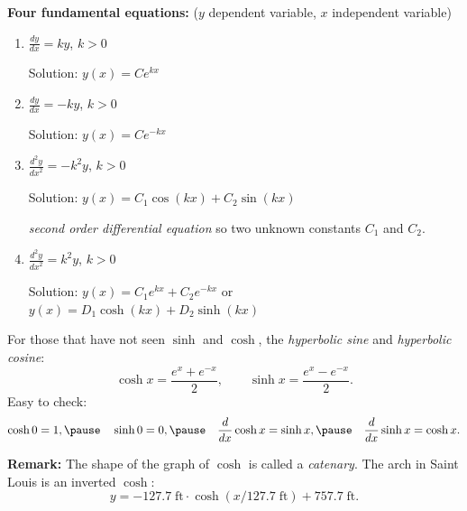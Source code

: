 \documentclass[10pt,aspectratio=169]{beamer}
\begin{document}
\begin{frame}
\textbf{Four fundamental equations:} ($y$ dependent variable, $x$ independent variable)

\medskip
\begin{enumerate}
\item\pause
$\displaystyle \frac{dy}{dx} = k y$, \quad $k > 0$

\medskip
\pause
Solution: \quad $y(x) = C e^{kx}$

\medskip
\item\pause
$\displaystyle \frac{dy}{dx} = -k y$, \quad $k > 0$

\medskip
\pause
Solution: \quad $y(x) = C e^{-kx}$

\medskip
\item\pause
$\displaystyle \frac{d^2y}{{dx}^2} = -k^2 y$, \quad $k > 0$

\medskip
\pause
Solution: \quad $y(x) = C_1 \cos(kx) + C_2 \sin(kx)$

\pause
\emph{second order differential equation} so two unknown constants $C_1$ and $C_2$.

\medskip
\item\pause
$\displaystyle \frac{d^2y}{{dx}^2} = k^2 y$, \quad $k > 0$

\medskip
\pause
Solution: \quad $y(x) = C_1 e^{kx}  + C_2 e^{-kx}$
\pause
\quad or \quad $y(x) = D_1 \cosh(kx) + D_2 \sinh(kx)$

\end{enumerate}

\end{frame}

\begin{frame}
For those that have not seen $\sinh$ and $\cosh$, the
\emph{hyperbolic sine} and \emph{hyperbolic cosine}:
\[
\cosh x = \frac{e^{x} + e^{-x}}{2} , \qquad
\sinh x = \frac{e^{x} - e^{-x}}{2} .
\]
\pause
Easy to check:
\[
\cosh 0 = 1,
\pause
\quad
\sinh 0 = 0,
\pause
\quad
\frac{d}{dx} \cosh x = \sinh x,
\pause
\quad
\frac{d}{dx} \sinh x = \cosh x.
\]

\medskip
\pause
\textbf{Remark:} The shape of the graph of $\cosh$ is called a \emph{catenary}.
The arch in Saint Louis is an inverted $\cosh$:
\begin{equation*}
y = -127.7 \; \textrm{ft} \cdot \cosh({x / 127.7  \; \textrm{ft}}) + 757.7 \;
\textrm{ft} .
\end{equation*}


\end{frame}
\end{document}
